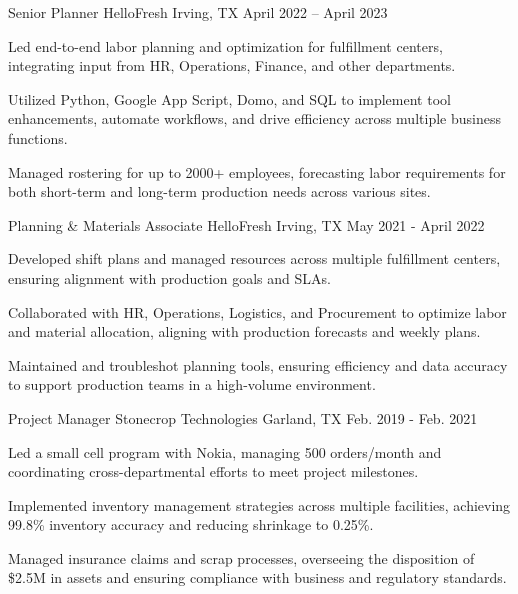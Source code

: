 \begin{cventries}
\cventry
  {Senior Planner} %
  {HelloFresh} %
  {Irving, TX} %
  {April 2022 – April 2023} %
  {
    \begin{cvitems} %
      \item {Led end-to-end labor planning and optimization for fulfillment centers, integrating input from HR, Operations, Finance, and other departments.}
      \item {Utilized Python, Google App Script, Domo, and SQL to implement tool enhancements, automate workflows, and drive efficiency across multiple business functions.}
      \item {Managed rostering for up to 2000+ employees, forecasting labor requirements for both short-term and long-term production needs across various sites.}
    \end{cvitems}
  }

\cventry
  {Planning \& Materials Associate} %
  {HelloFresh} %
  {Irving, TX} %
  {May 2021 - April 2022} %
  {
    \begin{cvitems} %
      \item {Developed shift plans and managed resources across multiple fulfillment centers, ensuring alignment with production goals and SLAs.}
      \item {Collaborated with HR, Operations, Logistics, and Procurement to optimize labor and material allocation, aligning with production forecasts and weekly plans.}
      \item {Maintained and troubleshot planning tools, ensuring efficiency and data accuracy to support production teams in a high-volume environment.}
    \end{cvitems}
  }

\cventry
  {Project Manager} %
  {Stonecrop Technologies} %
  {Garland, TX} %
  {Feb. 2019 - Feb. 2021} %
  {
    \begin{cvitems} %
      \item {Led a small cell program with Nokia, managing 500 orders/month and coordinating cross-departmental efforts to meet project milestones.}
      \item {Implemented inventory management strategies across multiple facilities, achieving 99.8\% inventory accuracy and reducing shrinkage to 0.25\%.}
      \item {Managed insurance claims and scrap processes, overseeing the disposition of \$2.5M in assets and ensuring compliance with business and regulatory standards.}
    \end{cvitems}
  }


\end{cventries}
